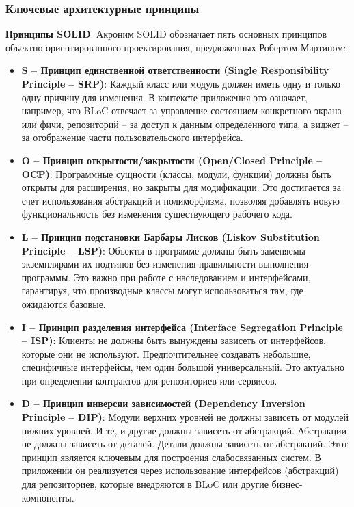 \subsubsection*{Ключевые архитектурные принципы}
\textbf{Принципы SOLID}.
Акроним SOLID обозначает пять основных принципов объектно-ориентированного проектирования, предложенных Робертом Мартином:
\begin{itemize}
    \item \textbf{S – Принцип единственной ответственности (Single Responsibility Principle – SRP)}: Каждый класс или модуль должен иметь одну и только одну причину для изменения. В контексте приложения это означает, например, что BLoC отвечает за управление состоянием конкретного экрана или фичи, репозиторий – за доступ к данным определенного типа, а виджет – за отображение части пользовательского интерфейса.
    \item \textbf{O – Принцип открытости/закрытости (Open/Closed Principle – OCP)}: Программные сущности (классы, модули, функции) должны быть открыты для расширения, но закрыты для модификации. Это достигается за счет использования абстракций и полиморфизма, позволяя добавлять новую функциональность без изменения существующего рабочего кода.
    \item \textbf{L – Принцип подстановки Барбары Лисков (Liskov Substitution Principle – LSP)}: Объекты в программе должны быть заменяемы экземплярами их подтипов без изменения правильности выполнения программы. Это важно при работе с наследованием и интерфейсами, гарантируя, что производные классы могут использоваться там, где ожидаются базовые.
    \item \textbf{I – Принцип разделения интерфейса (Interface Segregation Principle – ISP)}: Клиенты не должны быть вынуждены зависеть от интерфейсов, которые они не используют. Предпочтительнее создавать небольшие, специфичные интерфейсы, чем один большой универсальный. Это актуально при определении контрактов для репозиториев или сервисов.
    \item \textbf{D – Принцип инверсии зависимостей (Dependency Inversion Principle – DIP)}: Модули верхних уровней не должны зависеть от модулей нижних уровней. И те, и другие должны зависеть от абстракций. Абстракции не должны зависеть от деталей. Детали должны зависеть от абстракций. Этот принцип является ключевым для построения слабосвязанных систем. В приложении он реализуется через использование интерфейсов (абстракций) для репозиториев, которые внедряются в BLoC или другие бизнес-компоненты.
\end{itemize}

